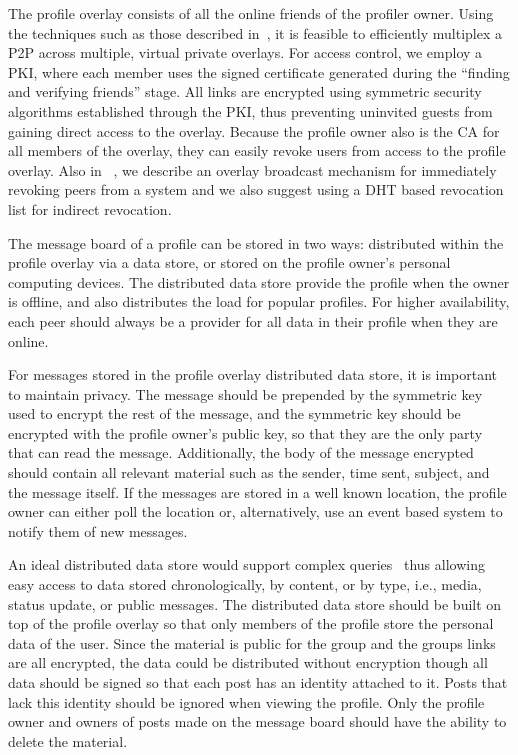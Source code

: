 \documentclass[letterpaper,twocolumn,10pt]{article}
\begin{document}
The profile overlay consists of all the online friends of the profiler owner.
Using the techniques such as those described in~\cite{icdcs10}, it is feasible
to efficiently multiplex a P2P across multiple, virtual private overlays.
For access control, we employ a PKI, where each member uses the signed certificate
generated during the ``finding and verifying friends'' stage.  All links are
encrypted using symmetric security algorithms established through the PKI,
thus preventing uninvited guests from gaining direct access to the overlay.
Because the profile owner also is the CA for all members of the overlay, they
can easily revoke users from access to the profile overlay.  Also in ~\cite{icdcs10}, we describe
an overlay broadcast mechanism
for immediately revoking peers from a system and we also suggest using a DHT based
revocation list for indirect revocation.

The message board of a profile can be stored in two ways: distributed within the profile overlay via a
data store, or stored on the profile owner's personal computing devices.
The distributed data store provide the profile when the
owner is offline, and also distributes the load for popular profiles.  For higher availability,
each peer should always be a provider
for all data in their profile when they are online.


For messages stored in the profile overlay distributed data store, it is important to maintain privacy.
The message should be prepended by the symmetric
key used to encrypt the rest of the message, and the symmetric key should be
encrypted with the profile owner's public key, so that they are the only party
that can read the message.  Additionally, the body of the message encrypted
should contain all relevant material such as the sender, time sent, subject,
and the message itself.  If the messages are stored in a well known location,
the profile owner can either poll the location or, alternatively, use an event
based system to notify them of new messages.

An ideal distributed data store would support complex queries~\cite{complex_queries}
thus allowing easy access to data stored chronologically, by content, or by type,
i.e., media, status update, or public messages.  The distributed data store
should be built on top of the profile overlay so that only members of the
profile store the personal data of the user.  Since the material is public for
the group and the groups links are all encrypted, the data could be distributed
without encryption though all data should be signed so that each post has an
identity attached to it.  Posts that lack this identity should be ignored when
viewing the profile.  Only the profile owner and owners of posts made on the
message board should have the ability to delete the material.
\end{document}
